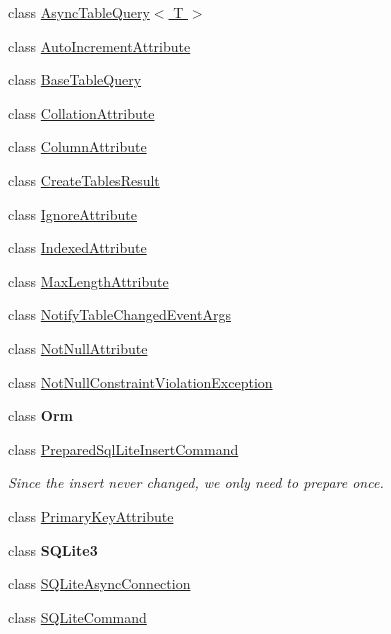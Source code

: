 \begin{DoxyCompactItemize}
\item 
class \hyperlink{class_s_q_lite_1_1_async_table_query_3_01_t_01_4}{Async\+Table\+Query$<$ T $>$}
\item 
class \hyperlink{class_s_q_lite_1_1_auto_increment_attribute}{Auto\+Increment\+Attribute}
\item 
class \hyperlink{class_s_q_lite_1_1_base_table_query}{Base\+Table\+Query}
\item 
class \hyperlink{class_s_q_lite_1_1_collation_attribute}{Collation\+Attribute}
\item 
class \hyperlink{class_s_q_lite_1_1_column_attribute}{Column\+Attribute}
\item 
class \hyperlink{class_s_q_lite_1_1_create_tables_result}{Create\+Tables\+Result}
\item 
class \hyperlink{class_s_q_lite_1_1_ignore_attribute}{Ignore\+Attribute}
\item 
class \hyperlink{class_s_q_lite_1_1_indexed_attribute}{Indexed\+Attribute}
\item 
class \hyperlink{class_s_q_lite_1_1_max_length_attribute}{Max\+Length\+Attribute}
\item 
class \hyperlink{class_s_q_lite_1_1_notify_table_changed_event_args}{Notify\+Table\+Changed\+Event\+Args}
\item 
class \hyperlink{class_s_q_lite_1_1_not_null_attribute}{Not\+Null\+Attribute}
\item 
class \hyperlink{class_s_q_lite_1_1_not_null_constraint_violation_exception}{Not\+Null\+Constraint\+Violation\+Exception}
\item 
class {\bfseries Orm}
\item 
class \hyperlink{class_s_q_lite_1_1_prepared_sql_lite_insert_command}{Prepared\+Sql\+Lite\+Insert\+Command}
\begin{DoxyCompactList}\small\item\em Since the insert never changed, we only need to prepare once. \end{DoxyCompactList}\item 
class \hyperlink{class_s_q_lite_1_1_primary_key_attribute}{Primary\+Key\+Attribute}
\item 
class {\bfseries S\+Q\+Lite3}
\item 
class \hyperlink{class_s_q_lite_1_1_s_q_lite_async_connection}{S\+Q\+Lite\+Async\+Connection}
\item 
class \hyperlink{class_s_q_lite_1_1_s_q_lite_command}{S\+Q\+Lite\+Command}
\item 

\end{DoxyCompactItemize}
